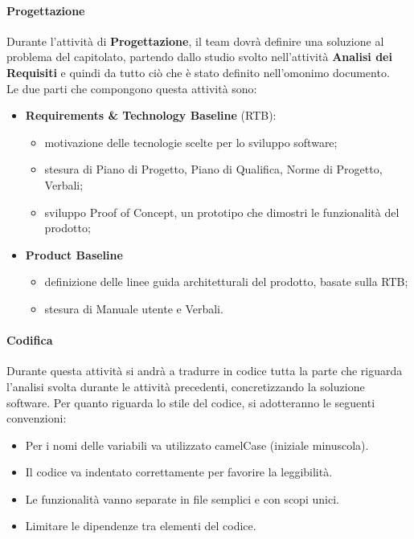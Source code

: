 \paragraph{Progettazione}
Durante l'attività di \textbf{Progettazione}, il team dovrà definire una soluzione al problema del capitolato, partendo dallo studio svolto nell'attività \textbf{Analisi dei Requisiti} e quindi da tutto ciò che è stato definito nell'omonimo documento.
\\
Le due parti che compongono questa attività sono:
\begin{itemize}
    \item  \textbf{Requirements \& Technology Baseline} (RTB):
    \begin{itemize}
        \item motivazione delle tecnologie scelte per lo sviluppo software;
        \item stesura di Piano di Progetto, Piano di Qualifica, Norme di Progetto, Verbali;
        \item sviluppo Proof of Concept, un prototipo che dimostri le funzionalità del prodotto;
    \end{itemize}
    \item \textbf{Product Baseline} 
    \begin{itemize}
        \item definizione delle linee guida architetturali del prodotto, basate sulla RTB;
        \item stesura di Manuale utente e Verbali.
    \end{itemize}
\end{itemize}

\paragraph{Codifica}
Durante questa attività si andrà a tradurre in codice tutta la parte che riguarda l'analisi svolta durante le attività precedenti, concretizzando la soluzione software.
Per quanto riguarda lo stile del codice, si adotteranno le seguenti convenzioni:
\begin{itemize}
\setlength\itemsep{0.1em}
    \item Per i nomi delle variabili va utilizzato camelCase (iniziale minuscola).
    \item Il codice va indentato correttamente per favorire la leggibilità.
    \item Le funzionalità vanno separate in file semplici e con scopi unici.
    \item Limitare le dipendenze tra elementi del codice.
\end{itemize}

